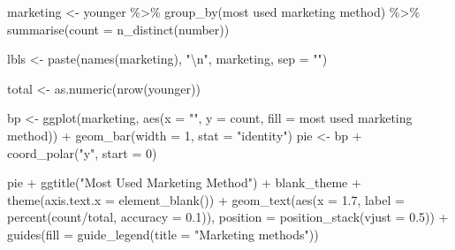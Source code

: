 \documentclass[
]{article}
\newenvironment{Shaded}{\begin{snugshade}}{\end{snugshade}}
\newcommand{\AttributeTok}[1]{\textcolor[rgb]{0.77,0.63,0.00}{#1}}
\newcommand{\DecValTok}[1]{\textcolor[rgb]{0.00,0.00,0.81}{#1}}
\newcommand{\FloatTok}[1]{\textcolor[rgb]{0.00,0.00,0.81}{#1}}
\newcommand{\FunctionTok}[1]{\textcolor[rgb]{0.00,0.00,0.00}{#1}}
\newcommand{\NormalTok}[1]{#1}
\newcommand{\OtherTok}[1]{\textcolor[rgb]{0.56,0.35,0.01}{#1}}
\newcommand{\SpecialCharTok}[1]{\textcolor[rgb]{0.00,0.00,0.00}{#1}}
\newcommand{\StringTok}[1]{\textcolor[rgb]{0.31,0.60,0.02}{#1}}
\begin{document}
\begin{Shaded}
\begin{Highlighting}[]
\NormalTok{marketing }\OtherTok{\textless{}{-}}\NormalTok{ younger }\SpecialCharTok{\%\textgreater{}\%}
    \FunctionTok{group\_by}\NormalTok{(}\StringTok{\textasciigrave{}}\AttributeTok{most used marketing method}\StringTok{\textasciigrave{}}\NormalTok{) }\SpecialCharTok{\%\textgreater{}\%}
    \FunctionTok{summarise}\NormalTok{(}\AttributeTok{count =} \FunctionTok{n\_distinct}\NormalTok{(number))}

\NormalTok{lbls }\OtherTok{\textless{}{-}} \FunctionTok{paste}\NormalTok{(}\FunctionTok{names}\NormalTok{(marketing), }\StringTok{"}\SpecialCharTok{\textbackslash{}n}\StringTok{"}\NormalTok{, marketing, }\AttributeTok{sep =} \StringTok{""}\NormalTok{)}

\NormalTok{total }\OtherTok{\textless{}{-}} \FunctionTok{as.numeric}\NormalTok{(}\FunctionTok{nrow}\NormalTok{(younger))}

\NormalTok{bp }\OtherTok{\textless{}{-}} \FunctionTok{ggplot}\NormalTok{(marketing, }\FunctionTok{aes}\NormalTok{(}\AttributeTok{x =} \StringTok{""}\NormalTok{, }\AttributeTok{y =}\NormalTok{ count, }\AttributeTok{fill =} \StringTok{\textasciigrave{}}\AttributeTok{most used marketing method}\StringTok{\textasciigrave{}}\NormalTok{)) }\SpecialCharTok{+}
    \FunctionTok{geom\_bar}\NormalTok{(}\AttributeTok{width =} \DecValTok{1}\NormalTok{, }\AttributeTok{stat =} \StringTok{"identity"}\NormalTok{)}
\NormalTok{pie }\OtherTok{\textless{}{-}}\NormalTok{ bp }\SpecialCharTok{+} \FunctionTok{coord\_polar}\NormalTok{(}\StringTok{"y"}\NormalTok{, }\AttributeTok{start =} \DecValTok{0}\NormalTok{)}

\NormalTok{pie }\SpecialCharTok{+} \FunctionTok{ggtitle}\NormalTok{(}\StringTok{"Most Used Marketing Method"}\NormalTok{) }\SpecialCharTok{+}\NormalTok{ blank\_theme }\SpecialCharTok{+} \FunctionTok{theme}\NormalTok{(}\AttributeTok{axis.text.x =} \FunctionTok{element\_blank}\NormalTok{()) }\SpecialCharTok{+}
    \FunctionTok{geom\_text}\NormalTok{(}\FunctionTok{aes}\NormalTok{(}\AttributeTok{x =} \FloatTok{1.7}\NormalTok{, }\AttributeTok{label =} \FunctionTok{percent}\NormalTok{(count}\SpecialCharTok{/}\NormalTok{total, }\AttributeTok{accuracy =} \FloatTok{0.1}\NormalTok{)),}
        \AttributeTok{position =} \FunctionTok{position\_stack}\NormalTok{(}\AttributeTok{vjust =} \FloatTok{0.5}\NormalTok{)) }\SpecialCharTok{+} \FunctionTok{guides}\NormalTok{(}\AttributeTok{fill =} \FunctionTok{guide\_legend}\NormalTok{(}\AttributeTok{title =} \StringTok{"Marketing methods"}\NormalTok{))}
\end{Highlighting}
\end{Shaded}
\end{document}
